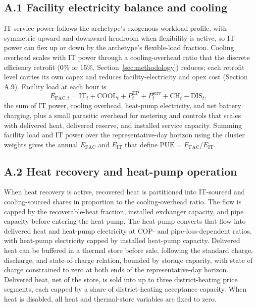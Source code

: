 \documentclass[preprint,12pt]{elsarticle}
\begin{document}
\subsection*{A.1 Facility electricity balance and cooling}
IT service power follows the archetype's exogenous workload profile, with symmetric upward and downward headroom when flexibility is active, so IT power can flex up or down by the archetype's flexible-load fraction. Cooling overhead scales with IT power through a cooling-overhead ratio that the discrete efficiency retrofit (0\% or 15\%, Section~\ref{sec:methodology}) reduces; each retrofit level carries its own capex and reduces facility-electricity and opex cost (Section A.9). Facility load at each hour is
\begin{equation}
E_{\text{FAC},t} = \text{IT}_t + \text{COOL}_t + P^{\text{HP}}_t + P^{\text{serv}}_t + \text{CH}_t - \text{DIS}_t,
\end{equation}
the sum of IT power, cooling overhead, heat-pump electricity, and net battery charging, plus a small parasitic overhead for metering and controls that scales with delivered heat, delivered reserve, and installed service capacity. Summing facility load and IT power over the representative-day horizon using the cluster weights gives the annual $E_{\text{FAC}}$ and $E_{\text{IT}}$ that define $\text{PUE}=E_{\text{FAC}}/E_{\text{IT}}$.

\subsection*{A.2 Heat recovery and heat-pump operation}
When heat recovery is active, recovered heat is partitioned into IT-sourced and cooling-sourced shares in proportion to the cooling-overhead ratio. The flow is capped by the recoverable-heat fraction, installed exchanger capacity, and pipe capacity before entering the heat pump. The heat pump converts that flow into delivered heat and heat-pump electricity at COP- and pipe-loss-dependent ratios, with heat-pump electricity capped by installed heat-pump capacity. Delivered heat can be buffered in a thermal store before sale, following the standard charge, discharge, and state-of-charge relation, bounded by storage capacity, with state of charge constrained to zero at both ends of the representative-day horizon. Delivered heat, net of the store, is sold into up to three district-heating price segments, each capped by a share of district-heating acceptance capacity. When heat is disabled, all heat and thermal-store variables are fixed to zero.
\end{document}
